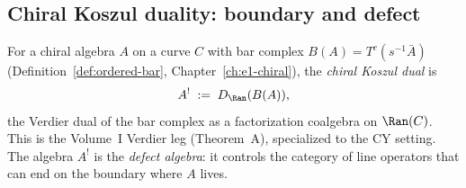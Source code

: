 \subsection{Chiral Koszul duality: boundary and defect}
\label{subsec:chiral-koszul-bd}

\begin{definition}
\label{def:chiral-koszul-dual}
For a chiral algebra $A$ on a curve $C$ with bar complex $B(A) = T^c(s^{-1}\bar{A})$ (Definition~\ref{def:ordered-bar}, Chapter~\ref{ch:e1-chiral}), the \emph{chiral Koszul dual} is
\[
 A^! \;:=\; D_{\Ran}(B(A)),
\]
the Verdier dual of the bar complex as a factorization coalgebra on $\Ran(C)$. This is the Volume~I Verdier leg (Theorem~A), specialized to the CY setting. The algebra $A^!$ is the \emph{defect algebra}: it controls the category of line operators that can end on the boundary where $A$ lives.
\end{definition}


